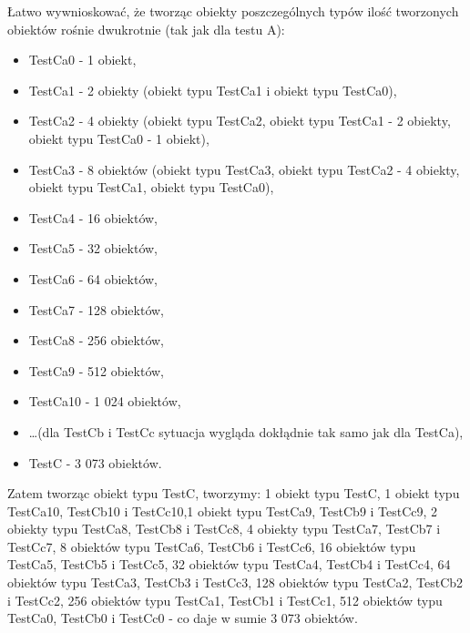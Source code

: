 \documentclass[12pt]{article}
\begin{document}
Łatwo wywnioskować, że tworząc obiekty poszczególnych typów ilość tworzonych obiektów rośnie dwukrotnie (tak jak dla testu A):
\begin{itemize}
	\item TestCa0 - 1 obiekt,
	\item TestCa1 - 2 obiekty (obiekt typu TestCa1 i obiekt typu TestCa0),
	\item TestCa2 - 4 obiekty (obiekt typu TestCa2, obiekt typu TestCa1 - 2 obiekty, obiekt typu TestCa0 - 1 obiekt),
	\item TestCa3 - 8 obiektów (obiekt typu TestCa3, obiekt typu TestCa2 - 4 obiekty, obiekt typu TestCa1, obiekt typu TestCa0),
	\item TestCa4 - 16 obiektów,
	\item TestCa5 - 32 obiektów,
	\item TestCa6 - 64 obiektów,
	\item TestCa7 - 128 obiektów,
	\item TestCa8 - 256 obiektów,
	\item TestCa9 - 512 obiektów,
	\item TestCa10 - 1 024 obiektów,
	\item \ldots (dla TestCb i TestCc sytuacja wygląda dokłądnie tak samo jak dla TestCa),
	\item TestC - 3 073 obiektów.
\end{itemize}
Zatem tworząc obiekt typu TestC, tworzymy: 1 obiekt typu TestC, 1 obiekt typu TestCa10, TestCb10 i TestCc10,1 obiekt typu TestCa9, TestCb9 i TestCc9, 2 obiekty typu TestCa8, TestCb8 i TestCc8, 4 obiekty typu TestCa7, TestCb7 i TestCc7, 8 obiektów typu TestCa6, TestCb6 i TestCc6, 16 obiektów typu TestCa5, TestCb5 i TestCc5, 32 obiektów typu TestCa4, TestCb4 i TestCc4, 64 obiektów typu TestCa3, TestCb3 i TestCc3, 128 obiektów typu TestCa2, TestCb2 i TestCc2, 256 obiektów typu TestCa1, TestCb1 i TestCc1, 512 obiektów typu TestCa0, TestCb0 i TestCc0 - co daje w sumie 3 073 obiektów.
\end{document}
